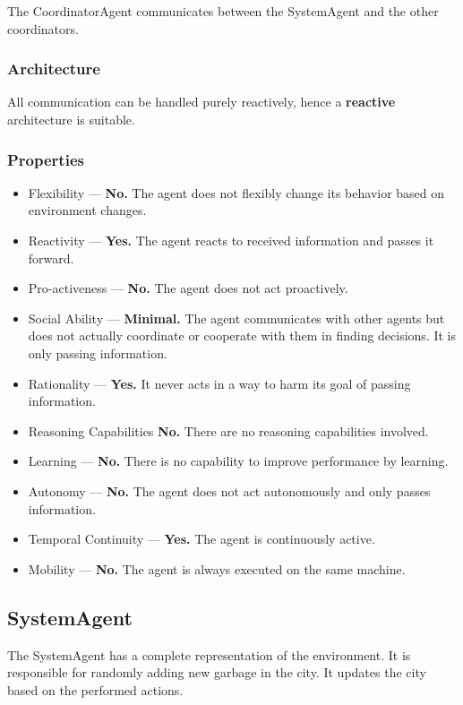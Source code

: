 The CoordinatorAgent communicates between the SystemAgent and the other coordinators.

\subsubsection*{Architecture}

All communication can be handled purely reactively, hence a \textbf{reactive} architecture is suitable.

\subsubsection*{Properties}

\begin{itemize}
	\item Flexibility — \textbf{No.} The agent does not flexibly change its behavior based on environment changes.
	\item Reactivity — \textbf{Yes.} The agent reacts to received information and passes it forward.
	\item Pro-activeness — \textbf{No.} The agent does not act proactively.
	\item Social Ability — \textbf{Minimal.} The agent communicates with other agents but does not actually coordinate or cooperate with them in finding decisions. It is only passing information.
	\item Rationality — \textbf{Yes.} It never acts in a way to harm its goal of passing information.
	\item Reasoning Capabilities \textbf{No.} There are no reasoning capabilities involved.
	\item Learning — \textbf{No.} There is no capability to improve performance by learning.
	\item Autonomy — \textbf{No.} The agent does not act autonomously and only passes information.
	\item Temporal Continuity — \textbf{Yes.} The agent is continuously active.
	\item Mobility — \textbf{No.} The agent is always executed on the same machine.
\end{itemize}

\subsection{SystemAgent}

The SystemAgent has a complete representation of the environment. It is responsible for randomly adding new garbage in the city. It updates the city based on the performed actions.

